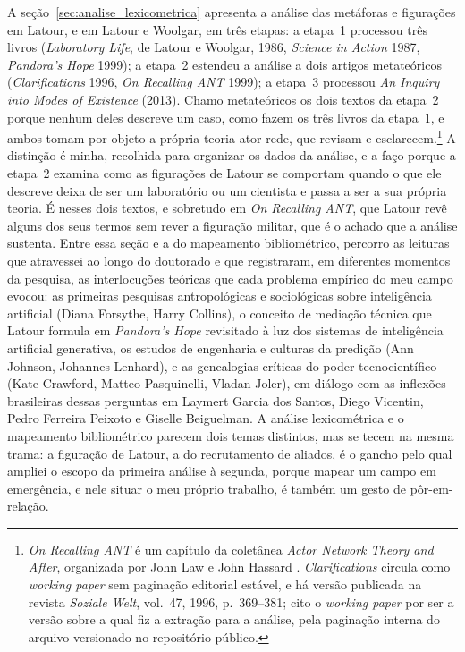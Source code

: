 A seção~\ref{sec:analise_lexicometrica} apresenta a análise das metáforas e figurações em Latour, e em Latour e Woolgar, em três etapas: a etapa~1 processou três livros (\emph{Laboratory Life}, de Latour e Woolgar, 1986, \emph{Science in Action} 1987, \emph{Pandora's Hope} 1999); a etapa~2 estendeu a análise a dois artigos metateóricos (\emph{Clarifications} 1996, \emph{On Recalling ANT} 1999);  a etapa~3 processou \emph{An Inquiry into Modes of Existence} (2013). Chamo metateóricos os dois textos da etapa~2 porque nenhum deles descreve um caso, como fazem os três livros da etapa~1, e ambos tomam por objeto a própria teoria ator-rede, que revisam e esclarecem.\footnote{\emph{On Recalling ANT} é um capítulo da coletânea \textit{Actor Network Theory and After}, organizada por John Law e John Hassard \parencite{LawHassard1999ANTAfter}. \emph{Clarifications} circula como \emph{working paper} sem paginação editorial estável, e há versão publicada na revista \textit{Soziale Welt}, vol.~47, 1996, p.~369--381; cito o \emph{working paper} por ser a versão sobre a qual fiz a extração para a análise, pela paginação interna do arquivo versionado no repositório público.} A distinção é minha, recolhida para organizar os dados da análise, e a faço porque a etapa~2 examina como as figurações de Latour se comportam quando o que ele descreve deixa de ser um laboratório ou um cientista e passa a ser a sua própria teoria. É nesses dois textos, e sobretudo em \emph{On Recalling ANT}, que Latour revê alguns dos seus termos sem rever a figuração militar, que é o achado que a análise sustenta. Entre essa seção e a do mapeamento bibliométrico, percorro as leituras que atravessei ao longo do doutorado e que registraram, em diferentes momentos da pesquisa, as interlocuções teóricas que cada problema empírico do meu campo evocou: as primeiras pesquisas antropológicas e sociológicas sobre inteligência artificial (Diana Forsythe, Harry Collins), o conceito de mediação técnica que Latour formula em \emph{Pandora's Hope} revisitado à luz dos sistemas de inteligência artificial generativa, os estudos de engenharia e culturas da predição (Ann Johnson, Johannes Lenhard), e as genealogias críticas do poder tecnocientífico (Kate Crawford, Matteo Pasquinelli, Vladan Joler), em diálogo com as inflexões brasileiras dessas perguntas em Laymert Garcia dos Santos, Diego Vicentin, Pedro Ferreira Peixoto e Giselle Beiguelman. A análise lexicométrica e o mapeamento bibliométrico parecem dois temas distintos, mas se tecem na mesma trama: a figuração de Latour, a do recrutamento de aliados, é o gancho pelo qual ampliei o escopo da primeira análise à segunda, porque mapear um campo em emergência, e nele situar o meu próprio trabalho, é também um gesto de pôr-em-relação.

